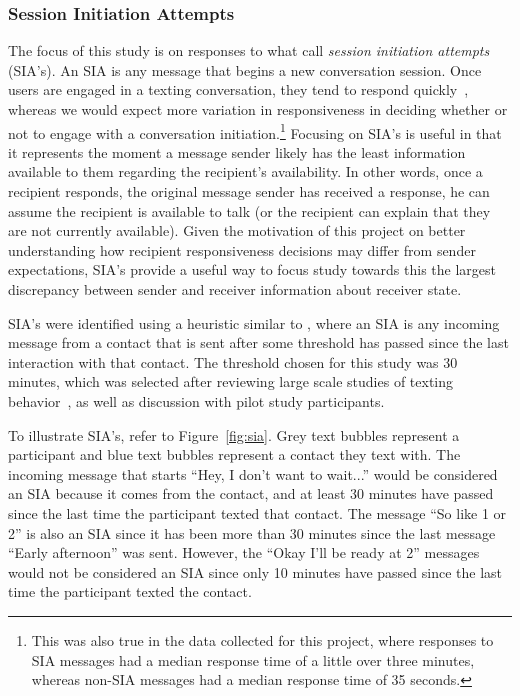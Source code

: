 \documentclass[12pt]{nuthesis}	%
\begin{document}
\subsubsection{Session Initiation Attempts}

The focus of this study is on responses to what \citet{avrahami2006responsiveness} call \textit{session initiation attempts} (SIA's). An SIA is any message that begins a new conversation session. Once users are engaged in a texting conversation, they tend to respond quickly~\citep{battestini2010large}, whereas we would expect more variation in responsiveness in deciding whether or not to engage with a conversation initiation.\footnote{This was also true in the data collected for this project, where responses to SIA messages had a median response time of a little over three minutes, whereas non-SIA messages had a median response time of 35 seconds.} Focusing on SIA's is useful in that it represents the moment a message sender likely has the least information available to them regarding the recipient's availability. In other words, once a recipient responds, the original message sender has received a response, he can assume the recipient is available to talk (or the recipient can explain that they are not currently available). Given the motivation of this project on better understanding how recipient responsiveness decisions may differ from sender expectations, SIA's provide a useful way to focus study towards this the largest discrepancy between sender and receiver information about receiver state.

SIA's were identified using a heuristic similar to \citet{avrahami2006responsiveness}, where an SIA is any incoming message from a contact that is sent after some threshold has passed since the last interaction with that contact. The threshold chosen for this study was 30 minutes, which was selected after reviewing large scale studies of texting behavior~\citep{battestini2010large,birnholtz2017attending}, as well as discussion with pilot study participants.

To illustrate SIA's, refer to Figure~\ref{fig:sia}. Grey text bubbles represent a participant and blue text bubbles represent a contact they text with. The incoming message that starts ``Hey, I don't want to wait...'' would be considered an SIA because it comes from the contact, and at least 30 minutes have passed since the last time the participant texted that contact. The message ``So like 1 or 2'' is also an SIA since it has been more than 30 minutes since the last  message ``Early afternoon'' was sent. However, the ``Okay I'll be ready at 2'' messages would not be considered an SIA since only 10 minutes have passed since the last time the participant texted the contact. 
 
\end{document}
